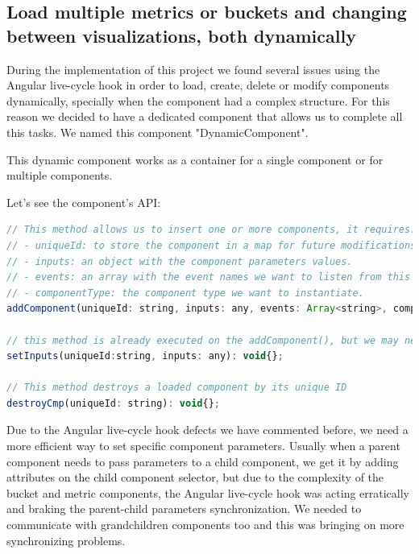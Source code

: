 \documentclass[a4paper, 12pt, english]{book}
\begin{document}
\subsection{Load multiple metrics or buckets and changing between visualizations, both dynamically}
\label{sec:loading-dynamically}
During the implementation of this project we found several issues using the Angular live-cycle hook in order to load, create, delete or modify components dynamically, specially when the component had a complex structure. For this reason we decided to have a dedicated component that allows us to complete all this tasks. We named this component "DynamicComponent".

This dynamic component works as a container for a single component or for multiple components.

Let's see the component's API:
\begin{lstlisting}[language=javascript]
// This method allows us to insert one or more components, it requires:
// - uniqueId: to store the component in a map for future modifications or access.
// - inputs: an object with the component parameters values.
// - events: an array with the event names we want to listen from this component.
// - componentType: the component type we want to instantiate.
addComponent(uniqueId: string, inputs: any, events: Array<string>, componentType: any): any{};

// this method is already executed on the addComponent(), but we may need it after the component initialization to modify some component parameter
setInputs(uniqueId:string, inputs: any): void{};

// This method destroys a loaded component by its unique ID
destroyCmp(uniqueId: string): void{};
\end{lstlisting}

Due to the Angular live-cycle hook defects we have commented before, we need a more efficient way to set specific component parameters. Usually when a parent component needs to pass parameters to a child component, we get it by adding attributes on the child component selector, but due to the complexity of the bucket and metric components, the Angular live-cycle hook was acting erratically and braking the parent-child parameters synchronization. We needed to communicate with grandchildren components too and this was bringing on more synchronizing problems.
\end{document}
